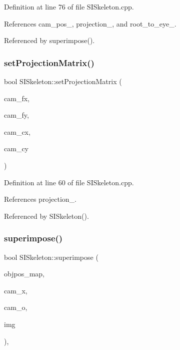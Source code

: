 Definition at line 76 of file S\+I\+Skeleton.\+cpp.



References cam\+\_\+pos\+\_\+, projection\+\_\+, and root\+\_\+to\+\_\+eye\+\_\+.



Referenced by superimpose().

\mbox{\label{classSISkeleton_aa1f5e1a67363038821a5d514fb361a38}} 
\subsubsection{\texorpdfstring{set\+Projection\+Matrix()}{setProjectionMatrix()}}
{\footnotesize\ttfamily bool S\+I\+Skeleton\+::set\+Projection\+Matrix (\begin{DoxyParamCaption}\item[{const float}]{cam\+\_\+fx,  }\item[{const float}]{cam\+\_\+fy,  }\item[{const float}]{cam\+\_\+cx,  }\item[{const float}]{cam\+\_\+cy }\end{DoxyParamCaption})}



Definition at line 60 of file S\+I\+Skeleton.\+cpp.



References projection\+\_\+.



Referenced by S\+I\+Skeleton().

\mbox{\label{classSISkeleton_a3f49fa3419370c2597435768f280c747}} 
\subsubsection{\texorpdfstring{superimpose()}{superimpose()}}
{\footnotesize\ttfamily bool S\+I\+Skeleton\+::superimpose (\begin{DoxyParamCaption}\item[{const \mbox{\hyperlink{classSuperimpose_a178e3d4e2def6635bfcf9454dd4b5d22}{Model\+Pose\+Container}} \&}]{objpos\+\_\+map,  }\item[{const double $\ast$}]{cam\+\_\+x,  }\item[{const double $\ast$}]{cam\+\_\+o,  }\item[{cv\+::\+Mat \&}]{img }\end{DoxyParamCaption})\hspace{0.3cm}{\ttfamily [override]}, {\ttfamily [virtual]}}



